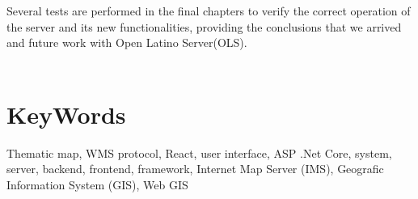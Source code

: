 Several tests are performed in the final chapters to verify the correct operation of the server and its new functionalities, providing the conclusions that we arrived and future work with Open Latino Server(OLS).\\\\

\section*{KeyWords}
Thematic map, WMS protocol, React, user interface, ASP .Net Core, system, server, backend, frontend, framework, Internet Map Server (IMS), Geografic Information System (GIS), Web GIS